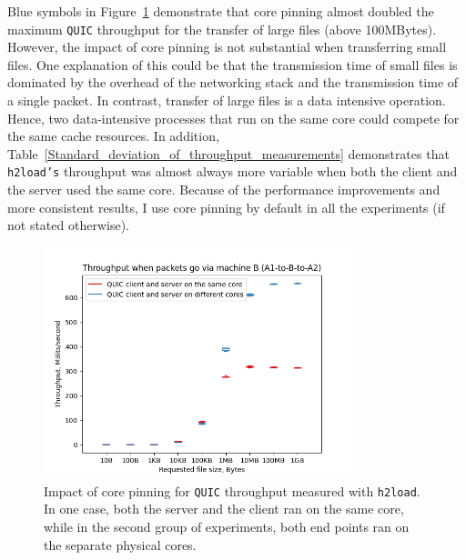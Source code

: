 \documentclass[12pt,a4paper]{report}
\newcommand\note[2]{{\color{#1}\bf #2}}
\newcommand\simon[1]{\ifcomments{\note{cyan}{SM: #1}}\fi}
\begin{document}
Blue symbols in Figure~\ref{fig:Throughput_via_A-to-B-to-A_MTU=1500} demonstrate that core pinning almost doubled the maximum \texttt{QUIC} throughput for the transfer of large files (above 100MBytes).
However, the impact of core pinning is not substantial when transferring small files.
One explanation of this could be that the transmission time of small files is dominated by the overhead of the networking stack and the transmission time of a single packet.
In contrast, transfer of large files is a data intensive operation.
Hence, two data-intensive processes that run on the same core could compete for the same cache resources.
In addition, Table~\ref{Standard_deviation_of_throughput_measurements} demonstrates that \texttt{h2load's} throughput was almost always more variable when both the client and the server used the same core.
Because of the performance improvements and more consistent results, I use core pinning by default in all the experiments (if not stated otherwise).

    \begin{figure}[H]
    \centering
    \includegraphics[width=0.8\textwidth]{figs/QUIC Throughput when packets go via machine B (A1-to-B-to-A2).png}
    \caption[Impact of core pinning for \texttt{QUIC} throughput measured with \texttt{h2load}]{Impact of core pinning for \texttt{QUIC} throughput measured with \texttt{h2load}. In one case, both the server and the client ran on the same core, while in the second group of experiments, both end points ran on the separate physical cores.}
    \label{fig:Throughput_via_A-to-B-to-A_MTU=1500}
    \end{figure}
\end{document}
